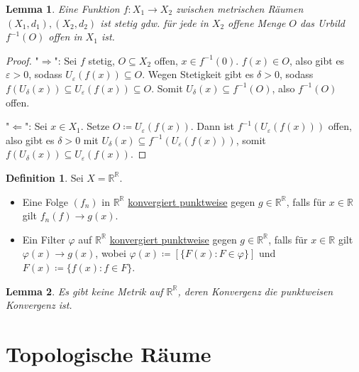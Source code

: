 \documentclass[12pt]{scrartcl}%
\newtheorem{lemma}{Lemma}
\theoremstyle{definition}
\newtheorem*{defn}{Definition}
\theoremstyle{remark}
\newcommand\Inv[1]{#1^{-1}}
\begin{document}
\begin{lemma}
    Eine Funktion $f: X_1\to X_2$ zwischen metrischen Räumen $(X_1, d_1), (X_2, d_2)$ ist stetig gdw. für jede in $X_2$ offene Menge $O$ das Urbild $\Inv f(O)$ offen in $X_1$ ist.
\end{lemma}

\begin{proof}
    "$\Rightarrow$": Sei $f$ stetig, $O \subseteq X_2$ offen, $x\in \Inv f(0)$. $f(x)\in O$, also gibt es $\varepsilon > 0$, sodass $U_\varepsilon(f(x)) \subseteq O$. Wegen Stetigkeit gibt es $\delta > 0$, sodass $f(U_\delta(x))\subseteq U_\varepsilon(f(x)) \subseteq O$. Somit $U_\delta(x)\subseteq \Inv f(O)$, also $\Inv f(O)$ offen.

    "$\Leftarrow$": Sei $x\in X_1$. Setze $O\coloneqq U_\varepsilon(f(x))$. Dann ist $\Inv f(U_\varepsilon(f(x)))$ offen, also gibt es $\delta > 0$ mit $U_\delta(x) \subseteq \Inv f(U_\varepsilon(f(x)))$, somit $f(U_\delta(x)) \subseteq U_\varepsilon(f(x))$.
\end{proof}

\begin{defn}
    Sei $X=\mathbb{R}^\mathbb{R}$. 
    
    \begin{itemize}
        \item Eine Folge $(f_n)$ in $\mathbb{R}^\mathbb{R}$ \underline{konvergiert punktweise} gegen $g\in \mathbb{R}^\mathbb{R}$, falls für $x\in \mathbb{R}$ gilt $f_n(f)\to g(x)$.
        \item Ein Filter $\varphi$ auf $\mathbb{R}^\mathbb{R}$ \underline{konvergiert punktweise} gegen $g\in \mathbb{R}^\mathbb{R}$, falls für $x\in \mathbb{R}$ gilt $\varphi(x)\to g(x)$, wobei $\varphi(x)\coloneqq [\{F(x): F\in\varphi\}]$ und $F(x)\coloneqq \{f(x): f\in F\}$.
    \end{itemize}
\end{defn}

\begin{lemma}
    Es gibt keine Metrik auf $\mathbb{R}^\mathbb{R}$, deren Konvergenz die punktweisen Konvergenz ist.
\end{lemma}

\section*{Topologische Räume}
\end{document}
